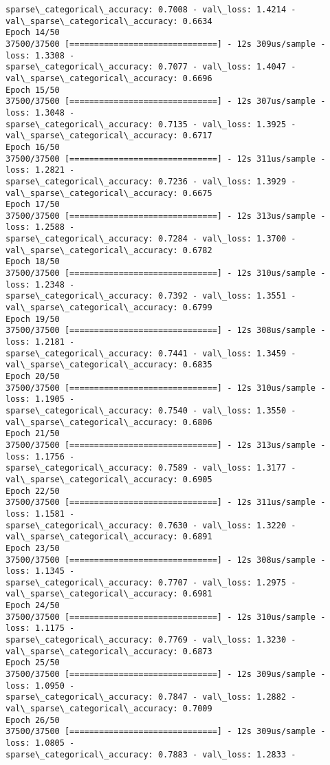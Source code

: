 \documentclass[11pt]{article}
\begin{document}
\begin{Verbatim}[commandchars=\\\{\}]
sparse\_categorical\_accuracy: 0.7008 - val\_loss: 1.4214 -
val\_sparse\_categorical\_accuracy: 0.6634
Epoch 14/50
37500/37500 [==============================] - 12s 309us/sample - loss: 1.3308 -
sparse\_categorical\_accuracy: 0.7077 - val\_loss: 1.4047 -
val\_sparse\_categorical\_accuracy: 0.6696
Epoch 15/50
37500/37500 [==============================] - 12s 307us/sample - loss: 1.3048 -
sparse\_categorical\_accuracy: 0.7135 - val\_loss: 1.3925 -
val\_sparse\_categorical\_accuracy: 0.6717
Epoch 16/50
37500/37500 [==============================] - 12s 311us/sample - loss: 1.2821 -
sparse\_categorical\_accuracy: 0.7236 - val\_loss: 1.3929 -
val\_sparse\_categorical\_accuracy: 0.6675
Epoch 17/50
37500/37500 [==============================] - 12s 313us/sample - loss: 1.2588 -
sparse\_categorical\_accuracy: 0.7284 - val\_loss: 1.3700 -
val\_sparse\_categorical\_accuracy: 0.6782
Epoch 18/50
37500/37500 [==============================] - 12s 310us/sample - loss: 1.2348 -
sparse\_categorical\_accuracy: 0.7392 - val\_loss: 1.3551 -
val\_sparse\_categorical\_accuracy: 0.6799
Epoch 19/50
37500/37500 [==============================] - 12s 308us/sample - loss: 1.2181 -
sparse\_categorical\_accuracy: 0.7441 - val\_loss: 1.3459 -
val\_sparse\_categorical\_accuracy: 0.6835
Epoch 20/50
37500/37500 [==============================] - 12s 310us/sample - loss: 1.1905 -
sparse\_categorical\_accuracy: 0.7540 - val\_loss: 1.3550 -
val\_sparse\_categorical\_accuracy: 0.6806
Epoch 21/50
37500/37500 [==============================] - 12s 313us/sample - loss: 1.1756 -
sparse\_categorical\_accuracy: 0.7589 - val\_loss: 1.3177 -
val\_sparse\_categorical\_accuracy: 0.6905
Epoch 22/50
37500/37500 [==============================] - 12s 311us/sample - loss: 1.1581 -
sparse\_categorical\_accuracy: 0.7630 - val\_loss: 1.3220 -
val\_sparse\_categorical\_accuracy: 0.6891
Epoch 23/50
37500/37500 [==============================] - 12s 308us/sample - loss: 1.1345 -
sparse\_categorical\_accuracy: 0.7707 - val\_loss: 1.2975 -
val\_sparse\_categorical\_accuracy: 0.6981
Epoch 24/50
37500/37500 [==============================] - 12s 310us/sample - loss: 1.1175 -
sparse\_categorical\_accuracy: 0.7769 - val\_loss: 1.3230 -
val\_sparse\_categorical\_accuracy: 0.6873
Epoch 25/50
37500/37500 [==============================] - 12s 309us/sample - loss: 1.0950 -
sparse\_categorical\_accuracy: 0.7847 - val\_loss: 1.2882 -
val\_sparse\_categorical\_accuracy: 0.7009
Epoch 26/50
37500/37500 [==============================] - 12s 309us/sample - loss: 1.0805 -
sparse\_categorical\_accuracy: 0.7883 - val\_loss: 1.2833 -

\end{Verbatim}
\end{document}
